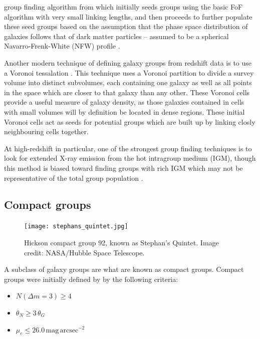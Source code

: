 group finding algorithm from \citet{yang2005, yang2007} which
initially seeds groups using the basic FoF algorithm with very small
linking lengths, and then proceeds to further populate these seed
groups based on the assumption that the phase space distribution of
galaxies follows that of dark matter particles -- assumed to be a
spherical Navarro-Frenk-White (NFW) profile \citep{navarro1997}.
\par
Another modern technique of defining galaxy groups from redshift data
is to use a Voronoi tessalation \citep{marinoni2002, gerke2005,
  gerke2012}.  This technique uses a Voronoi partition to divide a
survey volume into distinct subvolumes, each containing one
galaxy as well as all points in the space which are closer to that
galaxy than any other.  These Voronoi cells provide a useful measure
of galaxy density, as those galaxies contained in cells with small
volumes will by definition be located in dense regions.  These initial
Voronoi cells act as seeds for potential groups which are built up by
linking closly neighbouring cells together.
\par
At high-redshift in particular, one of the strongest group finding
techniques is to look for extended X-ray emission from the hot
intragroup medium (IGM), though this method is biased toward finding
groups with rich IGM which may not be representative of the total
group population \citep{connelly2012}.

\subsection{Compact groups}
\label{sec:compact_groups}

\begin{figure}[!ht]
  \centering
  \texttt{[image: stephans\_quintet.jpg]}
  \caption{Hickson compact group 92, known as Stephan's Quintet.
    Image credit: NASA/Hubble Space Telescope.}
  \label{fig:steph_quintet}
\end{figure}

A subclass of galaxy groups are what are known as compact groups.
Compact groups were initially defined by \citet{hickson1982} by the
following criteria:

\begin{itemize}
  \item $N(\Delta m = 3) \ge 4$

  \item $\theta_N \ge 3\,\theta_G$

  \item $\mu_e \le 26.0\,\mathrm{mag}\,\mathrm{arcsec^{-2}}$
\end{itemize}

